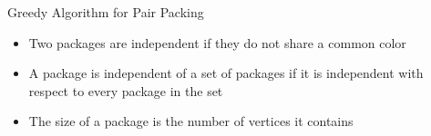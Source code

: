 \begin{frame}{Greedy Algorithm for Pair Packing}
\begin{itemize}


\item
Two packages are \alert{independent} if they do not share a common color

\pause\item
A package is \alert{independent} of a set of packages if it is independent with respect to every
package in the set  

\pause\item
The size of a package is the number of vertices it contains


\end{itemize}
\end{frame}